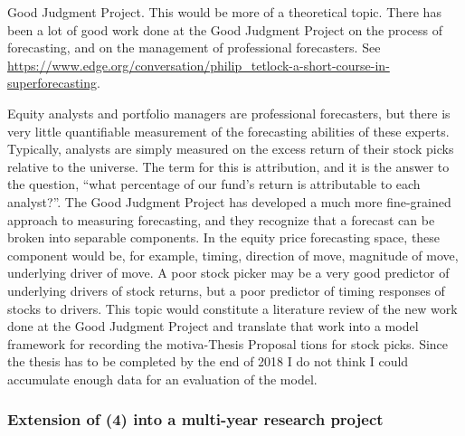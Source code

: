 \documentclass[11pt,preprint, authoryear]{elsarticle}
\numberwithin{equation}{section}
\numberwithin{figure}{section}
\numberwithin{table}{section}
\begin{document}
Good Judgment Project. This would be more of a theoretical topic. There
has been a lot of good work done at the Good Judgment Project on the
process of forecasting, and on the management of professional
forecasters. See
\url{https://www.edge.org/conversation/philip_tetlock-a-short-course-in-superforecasting}.

Equity analysts and portfolio managers are professional forecasters, but
there is very little quantifiable measurement of the forecasting
abilities of these experts. Typically, analysts are simply measured on
the excess return of their stock picks relative to the universe. The
term for this is attribution, and it is the answer to the question,
``what percentage of our fund's return is attributable to each
analyst?''. The Good Judgment Project has developed a much more
fine-grained approach to measuring forecasting, and they recognize that
a forecast can be broken into separable components. In the equity price
forecasting space, these component would be, for example, timing,
direction of move, magnitude of move, underlying driver of move. A poor
stock picker may be a very good predictor of underlying drivers of stock
returns, but a poor predictor of timing responses of stocks to drivers.
This topic would constitute a literature review of the new work done at
the Good Judgment Project and translate that work into a model framework
for recording the motiva-Thesis Proposal tions for stock picks. Since
the thesis has to be completed by the end of 2018 I do not think I could
accumulate enough data for an evaluation of the model.

\subsubsection{Extension of (4) into a multi-year research
project}\label{extension-of-4-into-a-multi-year-research-project}
\end{document}
